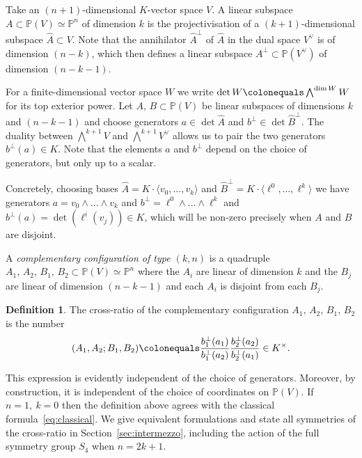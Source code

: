 \documentclass[11pt,a4paper]{amsart}
\newcommand{\Pp}{\mathbb{P}}
\newcommand{\pn}{\mathbb{P}^{n}}
\newcommand{\pv}{\mathbb{P}(V)}
\theoremstyle{plain}
\theoremstyle{definition}
\newtheorem{definition}[theorem]{Definition}
\theoremstyle{remark}
\newcommand{\coleq}{\colonequals}
\begin{document}
Take an $(n+1)$-dimensional $K$-vector space $V$. A linear subspace $A \subset \Pp(V) \simeq \pn$ of dimension $k$ is the projectivisation of a $(k+1)$-dimensional subspace $\hat A \subset V$. Note that the annihilator $\hat A^\perp$ of $\hat A$ in the dual space $V^\vee$ is of dimension $(n-k)$, which then defines a linear subspace $A^\perp \subset \Pp(V^\vee)$ of dimension $(n-k-1)$. 

For a finite-dimensional vector space $W$ we write $\det W \coleq \bigwedge^{\dim W} W$ for its top exterior power. Let $A, \, B \subset \pv$ be linear subspaces of dimensions $k$ and $(n-k-1)$ and choose generators $a \in \det \hat A$ and $b^\perp \in \det \hat B^\perp$. The duality between $\bigwedge^{k+1} V$ and $\bigwedge^{k+1} V^\vee$ allows us to pair the two generators $b^\perp(a) \in K$. Note that the elements $a$ and $b^\perp$ depend on the choice of generators, but only up to a scalar.

Concretely, choosing bases $\hat A = K\cdot\langle v_0,\dots,v_k \rangle$ and $\hat B^\perp = K\cdot\langle \ell^0,\dots,\ell^k \rangle$ we have generators $a = v_0 \wedge \dots \wedge v_k$ and $b^\perp = \ell^0 \wedge \dots \wedge \ell^k$ and $b^\perp(a) = \det (\ell^i(v_j)) \in K$, which will be non-zero precisely when $A$ and $B$ are disjoint. 

A \emph{complementary configuration of type $(k,n)$} is a quadruple $A_1,\, A_2,\, B_1, \, B_2 \subset \pv \simeq \pn$ where the $A_i$ are linear of dimension $k$ and the $B_j$ are linear of dimension $(n-k-1)$ and each $A_i$ is disjoint from each $B_j$. 

\begin{definition}\label{definintiongencr}
  The cross-ratio of the complementary configuration $A_1,\, A_2,\, B_1, \, B_2$  is the number 
  \begin{equation}
    (A_1,A_2;B_1,B_2) \coleq \frac{b_1^\perp(a_1)}{b_1^\perp(a_2)}\frac{b_2^\perp(a_2)}{b_2^\perp(a_1)} \in K^\times.
  \end{equation}
\end{definition}

This expression is evidently independent of the choice of generators. Moreover, by construction, it is independent of the choice of coordinates on $\pv$. If $n=1,\ k=0$ then the definition above agrees with the classical formula~\eqref{eq:classical}. We give equivalent formulations and state all symmetries of the cross-ratio in Section~\ref{sec:intermezzo}, including the action of the full symmetry group $S_4$ when $n=2k+1$.
\end{document}
